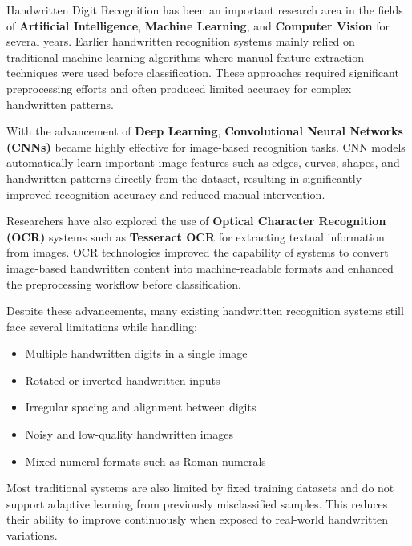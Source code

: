 \documentclass[12pt,a4paper]{article}
\begin{document}
\noindent
Handwritten Digit Recognition has been an important research area in the fields of \textbf{Artificial Intelligence}, \textbf{Machine Learning}, and \textbf{Computer Vision} for several years. Earlier handwritten recognition systems mainly relied on traditional machine learning algorithms where manual feature extraction techniques were used before classification. These approaches required significant preprocessing efforts and often produced limited accuracy for complex handwritten patterns.

\vspace{0.3cm}

\noindent
With the advancement of \textbf{Deep Learning}, \textbf{Convolutional Neural Networks (CNNs)} became highly effective for image-based recognition tasks. CNN models automatically learn important image features such as edges, curves, shapes, and handwritten patterns directly from the dataset, resulting in significantly improved recognition accuracy and reduced manual intervention.

\vspace{0.3cm}

\noindent
Researchers have also explored the use of \textbf{Optical Character Recognition (OCR)} systems such as \textbf{Tesseract OCR} for extracting textual information from images. OCR technologies improved the capability of systems to convert image-based handwritten content into machine-readable formats and enhanced the preprocessing workflow before classification.

\vspace{0.3cm}

\noindent
Despite these advancements, many existing handwritten recognition systems still face several limitations while handling:
\begin{itemize}
\item Multiple handwritten digits in a single image
\item Rotated or inverted handwritten inputs
\item Irregular spacing and alignment between digits
\item Noisy and low-quality handwritten images
\item Mixed numeral formats such as Roman numerals
\end{itemize}

\vspace{0.3cm}

\noindent
Most traditional systems are also limited by fixed training datasets and do not support adaptive learning from previously misclassified samples. This reduces their ability to improve continuously when exposed to real-world handwritten variations.
\end{document}
